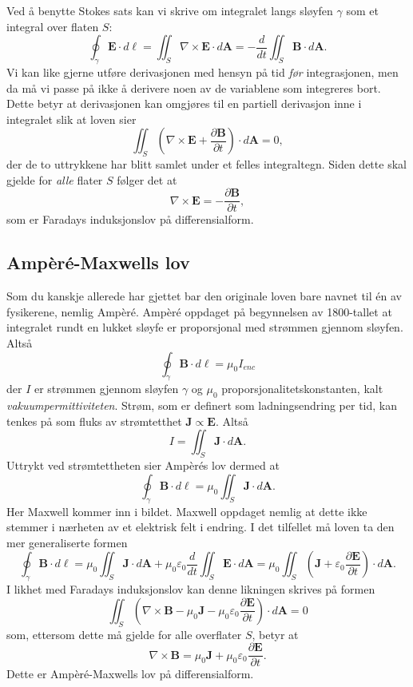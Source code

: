 \documentclass[twoside,utf8]{article}
\begin{document}
  Ved å benytte Stokes sats kan vi skrive om integralet langs sløyfen $\gamma$ som et integral over flaten $S$:
  $$
  \oint_\gamma \mathbf{E} \cdot d\ell = \iint_S \nabla \times \mathbf{E} \cdot d\mathbf{A} = -\frac{d}{dt}\iint_S \mathbf{B} \cdot d\mathbf{A}.
  $$
  Vi kan like gjerne utføre derivasjonen med hensyn på tid {\it før} integrasjonen, men da må vi passe på ikke å derivere noen av de variablene som integreres bort. Dette betyr at derivasjonen kan omgjøres til en partiell derivasjon inne i integralet slik at loven sier
  $$
  \iint_S \left( \nabla \times \mathbf{E} + \frac{\partial \mathbf{B}}{\partial t} \right)\cdot d\mathbf{A} = 0,
  $$
  der de to uttrykkene har blitt samlet under et felles integraltegn. Siden dette skal gjelde for {\it alle} flater $S$ følger det at
  $$
  \nabla \times \mathbf{E} =- \frac{\partial \mathbf{B}}{\partial t},
  $$
  som er Faradays induksjonslov på differensialform.




\subsection{Ampèré-Maxwells lov}
Som du kanskje allerede har gjettet bar den originale loven bare navnet til én av fysikerene, nemlig Ampèré. Ampèré oppdaget på begynnelsen av 1800-tallet at integralet rundt en lukket sløyfe er proporsjonal med strømmen gjennom sløyfen. Altså
$$
\oint_\gamma \mathbf{B} \cdot d\mathbf{\ell} = \mu_0 I_{enc}
$$
der $I$ er strømmen gjennom sløyfen $\gamma$ og $\mu_0$ proporsjonalitetskonstanten, kalt {\it vakuumpermittiviteten}. Strøm, som er definert som ladningsendring per tid, kan tenkes på som fluks av strømtetthet $\mathbf{J} \propto \mathbf{E}$. Altså
$$
I = \iint_S \mathbf{J}\cdot d\mathbf{A}.
$$
Uttrykt ved strømtettheten sier Ampèrés lov dermed at
$$
\oint_\gamma \mathbf{B} \cdot d\mathbf{\ell} = \mu_0 \iint_S \mathbf{J}\cdot d\mathbf{A}.
$$
Her Maxwell kommer inn i bildet. Maxwell oppdaget nemlig at dette ikke stemmer i nærheten av et elektrisk felt i endring. I det tilfellet må loven ta den mer generaliserte formen
$$
\oint_\gamma \mathbf{B} \cdot d\mathbf{\ell}
=
\mu_0 \iint_S
\mathbf{J}\cdot d\mathbf{A}
+
\mu_0 \varepsilon_0 \frac{d}{dt}\iint_S
\mathbf{E}\cdot d\mathbf{A}
=
\mu_0 \iint_S \left(
\mathbf{J}
+\varepsilon_0 \frac{\partial \mathbf{E}}{\partial t}
\right)\cdot d\mathbf{A}.
$$
I likhet med Faradays induksjonslov kan denne likningen skrives på formen
$$
\iint_S \left(\nabla \times \mathbf{B}
-\mu_0\mathbf{J}
-\mu_0\varepsilon_0 \frac{\partial \mathbf{E}}{\partial t}
\right)\cdot d\mathbf{A} = 0
$$
som, ettersom dette må gjelde for alle overflater $S$, betyr at
$$
\nabla \times \mathbf{B}
=
\mu_0\mathbf{J} + \mu_0\varepsilon_0 \frac{\partial \mathbf{E}}{\partial t}.
$$
Dette er Ampèré-Maxwells lov på differensialform.
\end{document}
